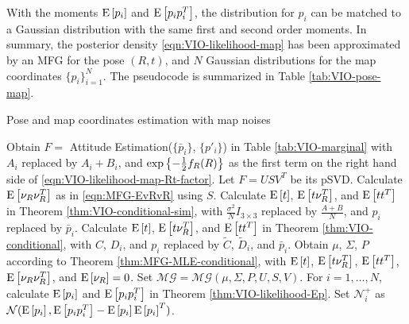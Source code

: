 With the moments $\mathrm{E}\left[ p_i \right]$ and $\mathrm{E}\left[ p_ip_i^T \right]$, the distribution for $p_i$ can be matched to a Gaussian distribution with the same first and second order moments.
In summary, the posterior density \eqref{eqn:VIO-likelihood-map} has been approximated by an MFG for the pose $(R,t)$, and $N$ Gaussian distributions for the map coordinates $\{p_i\}_{i=1}^N$.
The pseudocode is summarized in Table \ref{tab:VIO-pose-map}.

\begin{table}
	\caption{Pose and map coordinates estimation with map noises}
	\label{tab:VIO-pose-map}
	\begin{algorithmic}[1]
		\algrule[0.8pt]
		\algrule
		\State Obtain $F=$ Attitude Estimation($\{\bar{p}_i\}$, $\{p'_i\}$) in Table \ref{tab:VIO-marginal} with $A_i$ replaced by $A_i+B_i$, and $\exp\left\{ -\tfrac{1}{2}f_R(R) \right\}$ as the first term on the right hand side of \eqref{eqn:VIO-likelihood-map-Rt-factor}.
		\State Let $F = USV^T$ be its pSVD.
		\State Calculate $\mathrm{E}\left[ \nu_R\nu_R^T \right]$ as in \eqref{eqn:MFG-EvRvR} using $S$.
		\State Calculate $\mathrm{E}\left[ t \right]$, $\mathrm{E}\left[ t\nu_R^T \right]$, and $\mathrm{E}\left[ tt^T \right]$ in Theorem \ref{thm:VIO-conditional-sim}, with $\tfrac{\sigma^2}{N}I_{3\times 3}$ replaced by $\tfrac{A+B}{N}$, and $p_i$ replaced by $\bar{p}_i$.
		\Else
		\State Calculate $\mathrm{E}\left[ t \right]$, $\mathrm{E}\left[ t\nu_R^T \right]$, and $\mathrm{E}\left[ tt^T \right]$ in Theorem \ref{thm:VIO-conditional}, with $C$, $D_i$, and $p_i$ replaced by $\tilde{C}$, $\tilde{D}_i$, and $\bar{p}_i$.
		\EndIf
		\State Obtain $\mu$, $\Sigma$, $P$ according to Theorem \ref{thm:MFG-MLE-conditional}, with $\mathrm{E}\left[ t \right]$, $\mathrm{E}\left[ t\nu_R^T \right]$, $\mathrm{E}\left[ tt^T \right]$, $\mathrm{E}\left[ \nu_R\nu_R^T \right]$, and $\mathrm{E}\left[ \nu_R \right] = 0$.
		\State Set $\mathcal{MG} = \mathcal{MG}(\mu,\Sigma,P,U,S,V)$.
		\State For $i=1,\ldots,N$, calculate $\mathrm{E}\left[ p_i \right]$ and $\mathrm{E}\left[ p_ip_i^T \right]$ in Theorem \ref{thm:VIO-likelihood-Ep}.
		\State Set $\mathcal{N}_i^+$ as $\mathcal{N}(\mathrm{E}\left[ p_i \right], \mathrm{E}\left[ p_ip_i^T \right]-\mathrm{E}\left[ p_i \right]\mathrm{E}\left[ p_i \right]^T)$.
		\EndProcedure
		\algrule[0.8pt]
	\end{algorithmic}
\end{table}


